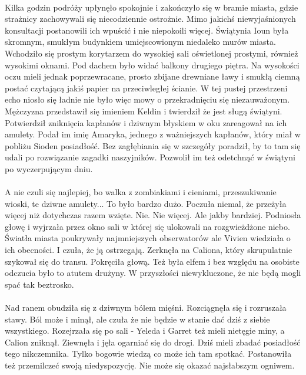 \documentclass[10pt,twoside,twocolumn]{book}
\begin{document}
\paragraph{}
Kilka godzin podróży upłynęło spokojnie i zakończyło się w bramie miasta, gdzie strażnicy zachowywali się niecodziennie ostrożnie. 
Mimo jakichś niewyjaśnionych konsultacji postanowili ich wpuścić i nie niepokoili więcej.
Świątynia Ioun była skromnym, smukłym budynkiem umiejscowionym niedaleko murów miasta. 
Wchodziło się prostym korytarzem do wysokiej sali oświetlonej prostymi, również wysokimi oknami. 
Pod dachem było widać balkony drugiego piętra. 
Na wysokości oczu mieli jednak poprzewracane, prosto zbijane drewniane ławy i smukłą ciemną postać czytającą jakiś papier na przeciwległej ścianie. 
W tej pustej przestrzeni echo niosło się ładnie nie było więc mowy o przekradnięciu się niezauważonym.
Mężczyzna przedstawił się imieniem Keldin i twierdził że jest sługą świątyni. 
Potwierdził zniknięcia kapłanów i dziwnym błyskiem w oku zareagował na ich amulety. 
Podał im imię Amaryka, jednego z ważniejszych kapłanów, który miał w pobliżu Sioden posiadłość. 
Bez zagłębiania się w szczegóły poradził, by to tam się udali po rozwiązanie zagadki naszyjników. 
Pozwolił im też odetchnąć w świątyni po wyczerpującym dniu.

\paragraph{}
A nie czuli się najlepiej, bo walka z zombiakiami i cieniami, przeszukiwanie wioski, te dziwne amulety... To było bardzo dużo. Poczuła niemal, że przeżyła więcej niż dotychczas razem wzięte.
Nie.
Nie więcej.
Ale jakby bardziej.
Podniosła głowę i wyjrzała przez okno sali w której się ulokowali na rozgwieżdżone niebo. 
Światła miasta poukrywały najmniejszych obserwatorów ale Vivien wiedziała o ich obecności. 
I czuła, że ją ostrzegają. 
Zerknęła na Caliona, który skrupulatnie szykował się do transu. 
Pokręciła głową. 
Też była elfem i bez względu na osobiste odczucia było to atutem drużyny. 
W przyszłości niewykluczone, że nie będą mogli spać tak beztrosko.

\paragraph{}
Nad ranem obudziła się z dziwnym bólem mięśni. 
Rozciągnęła się i rozruszała stawy. 
Ból może i minął, ale czuła że nie będzie w stanie dać dziś z siebie wszystkiego. 
Rozejrzała się po sali - Yeleda i Garret też mieli nietęgie miny, a Calion zniknął. 
Ziewnęła i jęła ogarniać się do drogi. 
Dziś mieli zbadać posiadłość tego nikczemnika. 
Tylko bogowie wiedzą co może ich tam spotkać. 
Postanowiła też przemilczeć swoją niedyspozycję. 
Nie może się okazać najsłabszym ogniwem.
\end{document}
